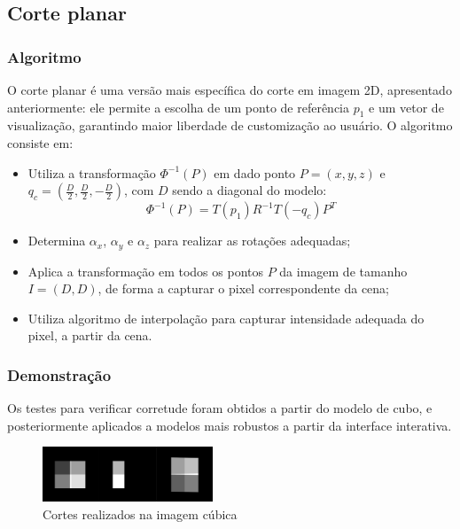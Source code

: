     \subsection{Corte planar}
        \subsubsection{Algoritmo}
            O corte planar é uma versão mais específica do corte em imagem 2D, apresentado anteriormente: ele permite a escolha de um ponto de referência $p_1$ e um vetor de visualização, garantindo maior liberdade de customização ao usuário. O algoritmo consiste em:

            \begin{itemize}
                \item Utiliza a transformação \textbf{$\Phi^{-1}(P)$} em dado ponto \textbf{$P = (x, y, z)$} e 
                $q_c = (\frac{D}{2}, \frac{D}{2}, -\frac{D}{2})$, com $D$ sendo a diagonal do modelo: \\
                    \begin{equation}
                        \Phi^{-1}(P) = T(p_1)R^{-1}T(-q_c)P^{T}
                    \end{equation}
                \item Determina $\alpha_x$, $\alpha_y$ e $\alpha_z$ para realizar as rotações adequadas;
                \item Aplica a transformação em todos os pontos $P$ da imagem de tamanho $I = (D, D)$, de forma a capturar o pixel correspondente da cena;
                \item Utiliza algoritmo de interpolação para capturar intensidade adequada do pixel, a partir da cena.
            \end{itemize}

        \subsubsection{Demonstração}
            Os testes para verificar corretude foram obtidos a partir do modelo de cubo, e posteriormente aplicados a modelos mais robustos a partir da interface interativa.

            \begin{figure}[ht!]
                \centering
                \includegraphics[width=2in]{figures/planar}
                \caption{Cortes realizados na imagem cúbica}
            \end{figure}

